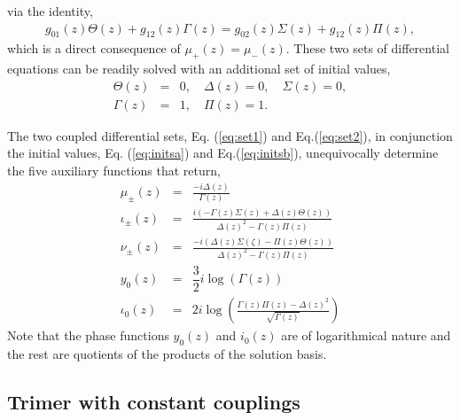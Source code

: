 \documentclass[9pt,twocolumn,twoside]{osajnl}
\begin{document}
via the identity, 
\begin{eqnarray}
g_{01}(z)\Theta(z) + g_{12}(z) \Gamma(z) =  g_{02}(z) \Sigma (z) + g_{12}(z) \Pi (z),
\end{eqnarray}
which is a direct consequence of $\mu_{+}(z)=\mu_{-}(z)$.
These two sets of differential equations can be readily solved with an additional set of initial values,
\begin{eqnarray}
\Theta(z)&=& 0 , \quad \Delta(z) =  0, \quad \Sigma(z)= 0,   \label{eq:initsa} \\
\Gamma(z)&=& 1, \quad \Pi(z)= 1. \label{eq:initsb}
\end{eqnarray}



The two coupled differential sets, Eq. (\ref{eq:set1}) and Eq.(\ref{eq:set2}), in conjunction the initial values, Eq. (\ref{eq:initsa}) and Eq.(\ref{eq:initsb}), 
unequivocally determine the five auxiliary functions that return, 
\begin{eqnarray}
\mu_{\pm}(z) &=& \frac{-i \Delta(z)}{\Gamma(z)} \\
\iota_{\pm}(z) &=& \frac{i(-\Gamma(z)\Sigma(z)+\Delta(z)\Theta(z))}{\Delta(z)^2-\Gamma(z)\Pi(z)}\\
\nu_{\pm}(z) &=& \frac{-i(\Delta(z)\Sigma(\zeta)-\Pi(z)\Theta(z))}{\Delta(z)^2-\Gamma(z)\Pi(z)}\\
y_0(z) &=&  \dfrac{3}{2} i \log (\Gamma(z))\label{eq:yzeto}\\
\iota_0(z) &=& 2 i \log (\frac{\Gamma(z)\Pi(z)-\Delta(z)^2}{\sqrt{\Gamma(z)}}) \label{eq:izero}
\end{eqnarray}
Note that the phase functions $y_0(z)$ and $i_0(z)$ are of logarithmical nature and the rest are quotients of the products of the solution basis. 




\subsection{Trimer with constant couplings}
\end{document}
